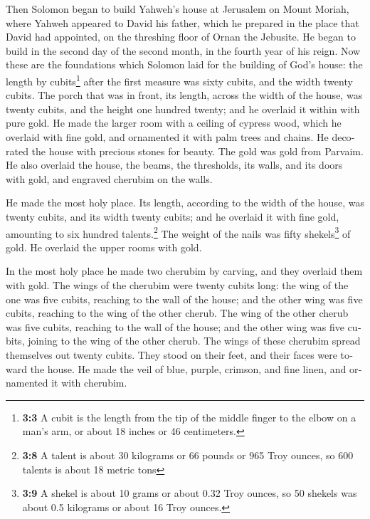 \begin{paracol}{2}
\begin{otherlanguage}{english}
 Then Solomon began to build Yahweh's house at Jerusalem
on Mount Moriah, where Yahweh appeared to David his father, which he
prepared in the place that David had appointed, on the threshing floor
of Ornan the Jebusite.  He began to build in the second
day of the second month, in the fourth year of his reign. 
Now these are the foundations which Solomon laid for the building of
God's house: the length by cubits\footnote{\textbf{3:3} A cubit is the
  length from the tip of the middle finger to the elbow on a man's arm,
  or about 18 inches or 46 centimeters.} after the first measure was
sixty cubits, and the width twenty cubits.  The porch that
was in front, its length, across the width of the house, was twenty
cubits, and the height one hundred twenty; and he overlaid it within
with pure gold.  He made the larger room with a ceiling of
cypress wood, which he overlaid with fine gold, and ornamented it with
palm trees and chains.  He decorated the house with
precious stones for beauty. The gold was gold from Parvaim.
 He also overlaid the house, the beams, the thresholds,
its walls, and its doors with gold, and engraved cherubim on the walls.

 He made the most holy place. Its length, according to the
width of the house, was twenty cubits, and its width twenty cubits; and
he overlaid it with fine gold, amounting to six hundred
talents.\footnote{\textbf{3:8} A talent is about 30 kilograms or 66
  pounds or 965 Troy ounces, so 600 talents is about 18 metric tons}
 The weight of the nails was fifty shekels\footnote{\textbf{3:9}
  A shekel is about 10 grams or about 0.32 Troy ounces, so 50 shekels
  was about 0.5 kilograms or about 16 Troy ounces.} of gold. He overlaid
the upper rooms with gold.

 In the most holy place he made two cherubim by carving,
and they overlaid them with gold.  The wings of the
cherubim were twenty cubits long: the wing of the one was five cubits,
reaching to the wall of the house; and the other wing was five cubits,
reaching to the wing of the other cherub.  The wing of
the other cherub was five cubits, reaching to the wall of the house; and
the other wing was five cubits, joining to the wing of the other cherub.
 The wings of these cherubim spread themselves out twenty
cubits. They stood on their feet, and their faces were toward the house.
 He made the veil of blue, purple, crimson, and fine
linen, and ornamented it with cherubim.


\end{otherlanguage}
\end{paracol}
